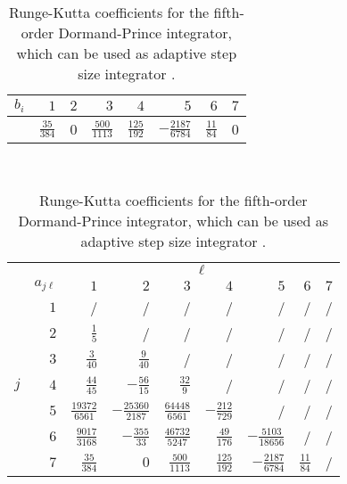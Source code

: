 \begin{table}
	\small
	\caption[Adaptive step size integrator Runge-Kutta coefficients]{Runge-Kutta coefficients for the fifth-order Dormand-Prince integrator, which can be used as adaptive step size integrator \cite{dormand1980family}.}
	\begin{minipage}{\textwidth}
		\centering
		\renewcommand{\arraystretch}{1.4}
		\begin{tabular}{r | r r r r r r r}
			$b_i$ & $1$ & $2$ & $3$ & $4$ & $5$ & $6$ & $7$\\
			\hline
			\hspace{0.935cm} & $\frac{35}{384}$ & 0 & $\frac{500}{1113}$ & $\frac{125}{192}$ & $-\frac{2187}{6784}$ & $\frac{11}{84}$ & 0
		\end{tabular}\\[0.2cm]
		\begin{tabular}{r r | r r r r r r r}
			& & \multicolumn{7}{c}{$\ell$} \\
			& $a_{j\ell}$ & $1$ & $2$ & $3$ & $4$ & $5$ & $6$ & $7$\\
			\hline
			\multirow{7}{*}{$j$} & $1$ & \hspace{0.5cm}/ &  \hspace{0.5cm}/ &  \hspace{0.5cm}/ &  \hspace{0.5cm}/ &  \hspace{0.5cm}/ &  \hspace{0.5cm}/ &  \hspace{0.5cm}/\\
			& $2$ & $\frac{1}5$ & / & / & / & / & / & / \\
			& $3$ & $\frac{3}{40}$ & $\frac{9}{40}$ & / & / & / & / & /\\
			& $4$ & $\frac{44}{45}$ & $-\frac{56}{15}$ & $\frac{32}9$ & / & / & / & /\\
			& $5$ & $\frac{19372}{6561}$ & $-\frac{25360}{2187}$ & $\frac{64448}{6561}$ & $-\frac{212}{729}$ & / & / & /\\
			& $6$ & $\frac{9017}{3168}$ & $-\frac{355}{33}$ & $\frac{46732}{5247}$ & $\frac{49}{176}$ & $-\frac{5103}{18656}$ & / & /\\
			& $7$ & $\frac{35}{384}$ & $0$ & $\frac{500}{1113}$ & $\frac{125}{192}$ & $-\frac{2187}{6784}$ & $\frac{11}{84}$ & /\\
		\end{tabular}\\[0.4cm]
		~~
	\end{minipage}
	\label{tbl:dormand-prince-coeff}
\end{table}


